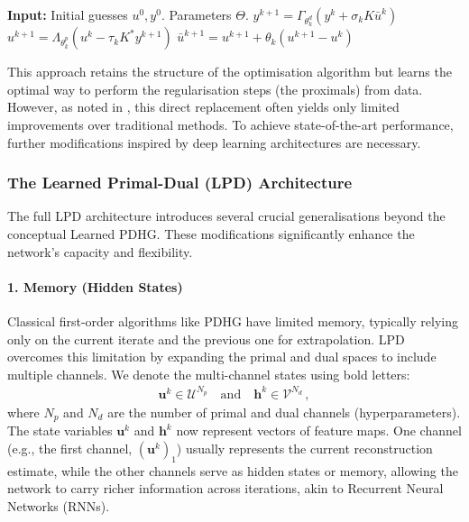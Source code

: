 \begin{algorithm}[H]
\caption{Learned PDHG (Conceptual)}\label{alg:learned_pdhg_conceptual}
\begin{algorithmic}
\State \textbf{Input:} Initial guesses $u^0, y^0$. Parameters $\Theta$.
\State $y^{k+1} = \Gamma_{\theta_k^d}(y^k + \sigma_k K \bar{u}^k)$
\State $u^{k+1} = \Lambda_{\theta_k^p}(u^k - \tau_k K^* y^{k+1})$
\State $\bar{u}^{k+1} = u^{k+1} + \theta_k (u^{k+1} - u^k)$
\EndFor
\end{algorithmic}
\end{algorithm}

This approach retains the structure of the optimisation algorithm but learns the optimal way to perform the regularisation steps (the proximals) from data. However, as noted in \cite{adler2018learned}, this direct replacement often yields only limited improvements over traditional methods. To achieve state-of-the-art performance, further modifications inspired by deep learning architectures are necessary.

\subsubsection{The Learned Primal-Dual (LPD) Architecture}

The full LPD architecture introduces several crucial generalisations beyond the conceptual Learned PDHG. These modifications significantly enhance the network's capacity and flexibility.

\paragraph{1. Memory (Hidden States)}
Classical first-order algorithms like PDHG have limited memory, typically relying only on the current iterate and the previous one for extrapolation. LPD overcomes this limitation by expanding the primal and dual spaces to include multiple channels. We denote the multi-channel states using bold letters:
\begin{align*}
    \mathbf{u}^k \in \mathcal{U}^{N_p} \quad \text{and} \quad \mathbf{h}^k \in \mathcal{V}^{N_d} \, ,
\end{align*}
where $N_p$ and $N_d$ are the number of primal and dual channels (hyperparameters). The state variables $\mathbf{u}^k$ and $\mathbf{h}^k$ now represent vectors of feature maps. One channel (e.g., the first channel, $(\mathbf{u}^k)_1$) usually represents the current reconstruction estimate, while the other channels serve as hidden states or memory, allowing the network to carry richer information across iterations, akin to Recurrent Neural Networks (RNNs).

